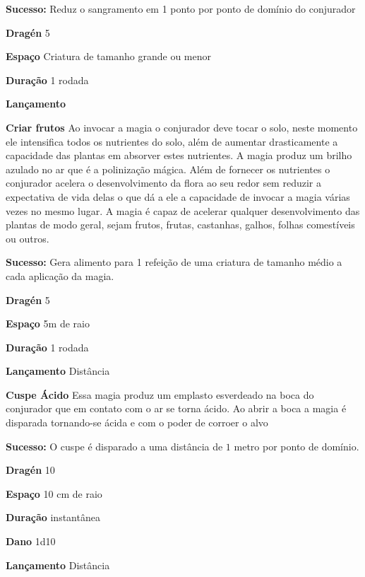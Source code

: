\textbf{Sucesso:} Reduz o sangramento em 1 ponto por ponto de domínio do conjurador

\textbf{Dragén} 5

\textbf{Espaço} Criatura de tamanho grande ou menor

\textbf{Duração} 1 rodada

\textbf{Lançamento}
\bigskip

\textbf{Criar  frutos }
Ao  invocar  a  magia  o  conjurador  deve  tocar  o  solo,  neste  momento  ele  intensifica  todos  os  nutrientes  
do  solo,  além  de  aumentar  drasticamente  a  capacidade  das  plantas  em  absorver  estes  nutrientes.
A  magia  produz  um  brilho  azulado  no  ar  que  é  a  polinização  mágica.  Além  de  fornecer  os  nutrientes  o  
conjurador  acelera  o  desenvolvimento  da  flora  ao  seu  redor  sem  reduzir  a  expectativa  de  vida  delas  
o  que  dá  a  ele  a  capacidade  de  invocar  a  magia  várias  vezes  no  mesmo  lugar.  A  magia  é  capaz  de  
acelerar  qualquer  desenvolvimento  das  plantas  de  modo  geral,  sejam  frutos,  frutas,  castanhas,  
galhos,  folhas  comestíveis  ou  outros. 

\textbf{Sucesso:} Gera  alimento  para  1  refeição  de  uma  criatura  de  tamanho  médio  a  cada  aplicação  da  magia.

\textbf{Dragén} 5

\textbf{Espaço} 5m de raio

\textbf{Duração} 1 rodada

\textbf{Lançamento} Distância
\bigskip

\textbf{Cuspe Ácido }
Essa  magia  produz  um  emplasto  esverdeado  na  boca  do  conjurador  que  em 
contato  com  o  ar  se  torna  ácido.  Ao  abrir  a  boca  a  magia  é  disparada 
tornando-se  ácida  e  com  o  poder  de  corroer  o  alvo

\textbf{Sucesso:} O  cuspe  é  disparado  a  uma  distância  de  $1$  metro  por  ponto  de  domínio.  

\textbf{Dragén} 10

\textbf{Espaço} 10 cm de raio

\textbf{Duração} instantânea

\textbf{Dano} 1d10

\textbf{Lançamento}
\bigskip Distância

